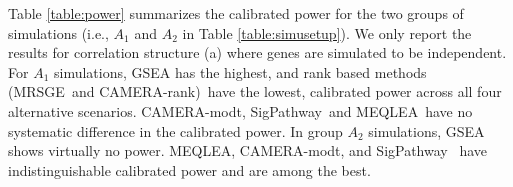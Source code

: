 \documentclass[a4,center,fleqn]{NAR}
\newcommand{\OurMethod}{MEQLEA}
\newcommand{\aaCase}{a}
\newcommand{\CMR}{CAMERA-rank}
\newcommand{\CMT}{CAMERA-modt}
\newcommand{\gent}{SigPathway}
\newcommand{\genr}{MRSGE}
\begin{document}
	Table \ref{table:power} summarizes the calibrated power for the two groups of simulations (i.e.,
	$A_1$ and $A_2$ in Table \ref{table:simusetup}). We only report the results for correlation
	structure (\aaCase) where genes are simulated to be independent. %
	For $A_1$ simulations, GSEA has the highest, and rank based methods (\genr~and \CMR)~have the
	lowest, calibrated power across all four alternative scenarios. \CMT, \gent~and \OurMethod~have no
	systematic difference in the calibrated power. %
	In group $A_2$ simulations, GSEA shows virtually no power. \OurMethod, \CMT, and \gent~ have
	indistinguishable calibrated power and are among the best.
	
\end{document}
